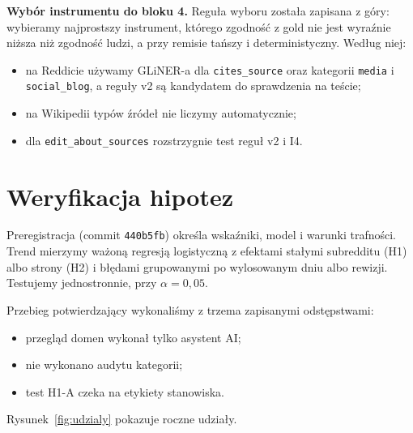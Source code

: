 \documentclass[11pt,a4paper]{article}
\newcommand{\kod}[1]{\texttt{#1}}
\newcommand{\tabela}[1]{{\small}}
\begin{document}
\begin{table}[htbp]
\centering
\caption{$\kappa$ Cohena instrumentów względem gold (zbiór testowy) i annotatorów między sobą (pilotaż), z odsetkiem zgodności.}
\label{tab:kappa}
\tabela{kappa}
\end{table}

\begin{table}[htbp]
\centering
\caption{Dokładny test McNemara dla \kod{cites\_source} na zbiorze testowym: liczba jednostek, w których trafnie klasyfikuje tylko jeden instrument z pary.}
\label{tab:mcnemar}
\tabela{mcnemar}
\end{table}

\begin{table}[htbp]
\centering
\caption{Zgodność rankingu kategorii (ważone udziały na zbiorze testowym) z rankingiem według gold: $\tau_b$ Kendalla.}
\label{tab:rankingi}
\tabela{rankings}
\end{table}

\textbf{Wybór instrumentu do bloku 4.} Reguła wyboru została zapisana z góry: wybieramy najprostszy instrument, którego zgodność z gold nie jest wyraźnie niższa niż zgodność ludzi, a przy remisie tańszy i deterministyczny. Według niej:
\begin{itemize}
  \item na Reddicie używamy GLiNER-a dla \kod{cites\_source} oraz kategorii \kod{media} i \kod{social\_blog}, a reguły v2 są kandydatem do sprawdzenia na teście;
  \item na Wikipedii typów źródeł nie liczymy automatycznie;
  \item dla \kod{edit\_about\_sources} rozstrzygnie test reguł v2 i I4.
\end{itemize}

\section{Weryfikacja hipotez}
\label{sec:hipotezy}

Preregistracja (commit \kod{440b5fb}) określa wskaźniki, model i warunki trafności. Trend mierzymy ważoną regresją logistyczną z efektami stałymi subredditu (H1) albo strony (H2) i błędami grupowanymi po wylosowanym dniu albo rewizji. Testujemy jednostronnie, przy $\alpha = 0{,}05$.

Przebieg potwierdzający wykonaliśmy z trzema zapisanymi odstępstwami:
\begin{itemize}
  \item przegląd domen wykonał tylko asystent AI;
  \item nie wykonano audytu kategorii;
  \item test H1-A czeka na etykiety stanowiska.
\end{itemize}
Rysunek~\ref{fig:udzialy} pokazuje roczne udziały.
\end{document}
